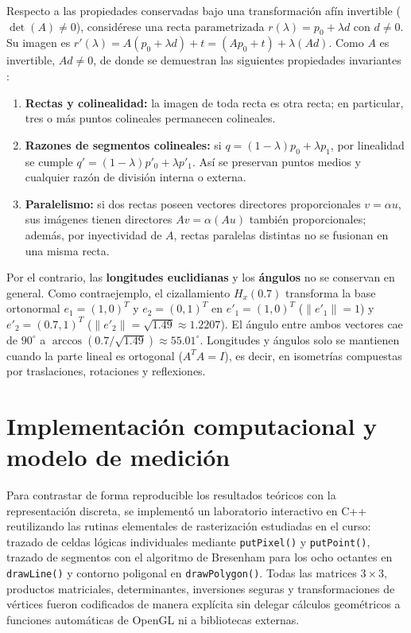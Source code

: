\documentclass[a4paper,10pt]{article}
\begin{document}
Respecto a las propiedades conservadas bajo una transformación afín invertible ($\det(A) \neq 0$), considérese una recta parametrizada $r(\lambda) = p_0 + \lambda d$ con $d \neq 0$. Su imagen es $r'(\lambda) = A(p_0 + \lambda d) + t = (Ap_0 + t) + \lambda(Ad)$. Como $A$ es invertible, $Ad \neq 0$, de donde se demuestran las siguientes propiedades invariantes \citep{shirley2021,vince2012}:
\begin{enumerate}
  \item \textbf{Rectas y colinealidad:} la imagen de toda recta es otra recta; en particular, tres o más puntos colineales permanecen colineales.
  \item \textbf{Razones de segmentos colineales:} si $q = (1-\lambda)p_0 + \lambda p_1$, por linealidad se cumple $q' = (1-\lambda)p'_0 + \lambda p'_1$. Así se preservan puntos medios y cualquier razón de división interna o externa.
  \item \textbf{Paralelismo:} si dos rectas poseen vectores directores proporcionales $v = \alpha u$, sus imágenes tienen directores $Av = \alpha(Au)$ también proporcionales; además, por inyectividad de $A$, rectas paralelas distintas no se fusionan en una misma recta.
\end{enumerate}

Por el contrario, las \textbf{longitudes euclidianas} y los \textbf{ángulos} no se conservan en general. Como contraejemplo, el cizallamiento $H_x(0.7)$ transforma la base ortonormal $e_1=(1,0)^T$ y $e_2=(0,1)^T$ en $e'_1=(1,0)^T$ ($\|e'_1\|=1$) y $e'_2=(0.7,1)^T$ ($\|e'_2\|=\sqrt{1.49}\approx 1.2207$). El ángulo entre ambos vectores cae de $90^\circ$ a $\arccos(0.7/\sqrt{1.49}) \approx 55.01^\circ$. Longitudes y ángulos solo se mantienen cuando la parte lineal es ortogonal ($A^T A = I$), es decir, en isometrías compuestas por traslaciones, rotaciones y reflexiones.

\section{Implementación computacional y modelo de medición}

Para contrastar de forma reproducible los resultados teóricos con la representación discreta, se implementó un laboratorio interactivo en C++ reutilizando las rutinas elementales de rasterización estudiadas en el curso: trazado de celdas lógicas individuales mediante \texttt{putPixel()} y \texttt{putPoint()}, trazado de segmentos con el algoritmo de Bresenham para los ocho octantes en \texttt{drawLine()} y contorno poligonal en \texttt{drawPolygon()}. Todas las matrices $3\times 3$, productos matriciales, determinantes, inversiones seguras y transformaciones de vértices fueron codificados de manera explícita sin delegar cálculos geométricos a funciones automáticas de OpenGL ni a bibliotecas externas.
\end{document}
